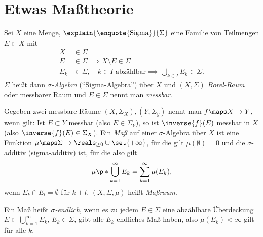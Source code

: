 \section{Etwas Maßtheorie}
\begin{definition}  
  Sei \( X \) eine Menge, \( \explain{\text{\enquote{Sigma}}}{\Sigma} \) eine Familie von Teilmengen \( E\subset X \) mit
  \begin{align*}
    X&\in \Sigma\\
    E&\in \Sigma\implies X\setminus E \in \Sigma\\
    E_k&\in \Sigma,\quad k\in I \text{ abzählbar}\implies\bigcup_{k\in I}E_k\in \Sigma.
  \end{align*}
  \( \Sigma \) heißt dann \emph{\( \sigma \)-Algebra} (\enquote{Sigma-Algebra}) über \( X \) und \( (X,\Sigma) \) \emph{Borel-Raum} oder messbarer Raum und \( E\in \Sigma \) nennt man \emph{messbar}.
  
  Gegeben zwei messbare Räume \( (X,\Sigma_X),(Y,\Sigma_y) \) nennt man \( f\maps X\to Y \), wenn gilt: Ist \( E\subset Y \) messbar (also \( E\in \Sigma_Y \)), so ist \( \inverse{f}(E) \) messbar in \( X \) (also \( \inverse{f}(E)\in \Sigma_X \)). Ein \emph{Maß } auf einer \( \sigma \)-Algebra über \( X \) ist eine Funktion \( \mu\maps \Sigma\to \reals_{\geq 0}\cup \set{+\infty} \), für die gilt \( \mu(\emptyset)=0 \) und die \( \sigma \)-additiv (sigma-additiv) ist, für die also gilt
  \begin{equation*}
    \mu\p*{\bigcup_{k=1}^{\infty}E_k}=\sum\limits_{k=1}^{\infty}\mu(E_k),
  \end{equation*}
  wenn \( E_k\cap E_l =\emptyset \) für \( k+l \). \( (X,\Sigma,\mu) \)  heißt \emph{Maßraum}.
\end{definition}
Ein Maß heißt \emph{\( \sigma \)-endlich}, wenn es zu jedem \( E\in \Sigma \) eine abzählbare Überdeckung \( E\subset \bigcup_{k=1}^\infty E_k \), \( E_k\in \Sigma \), gibt \sd alle \( E_k \) endliches Maß haben, also \( \mu(E_k)<\infty \) gilt für alle \( k \).

